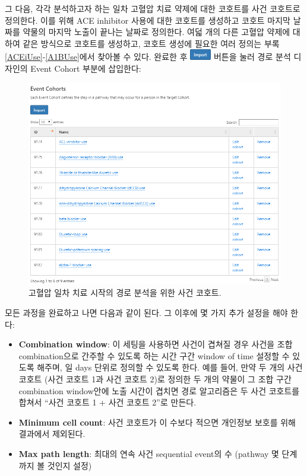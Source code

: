 \documentclass[10.5pt]{book}
\providecommand{\tightlist}{%
  \setlength{\itemsep}{0pt}\setlength{\parskip}{0pt}}
\theoremstyle{definition}
\theoremstyle{definition}
\theoremstyle{definition}
\theoremstyle{remark}
\begin{document}
그 다음, 각각 분석하고자 하는 일차 고혈압 치료 약제에 대한 코호트를 사건
코호트로 정의한다. 이를 위해 ACE inhibitor 사용에 대한 코호트를 생성하고
코호트 마지막 날짜를 약물의 마지막 노출이 끝나는 날짜로 정의한다. 여덟
개의 다른 고혈압 약제에 대하여 같은 방식으로 코호트를 생성하고, 코호트
생성에 필요한 여러 정의는 부록 \ref{ACEiUse}-\ref{A1BUse}에서 찾아볼 수
있다. 완료한 후
\includegraphics{images/Characterization/atlasImportButton.png} 버튼을
눌러 경로 분석 디자인의 Event Cohort 부분에 삽입한다:

\begin{figure}

{\centering \includegraphics[width=1\linewidth]{images/Characterization/atlasPathwaysEventCohorts} 

}

\caption{고혈압 일차 치료 시작의 경로 분석을 위한 사건 코호트.}\label{fig:atlasPathwaysEventCohorts}
\end{figure}

모든 과정을 완료하고 나면 다음과 같이 된다. 그 이후에 몇 가지 추가
설정을 해야 한다:

\begin{itemize}
\tightlist
\item
  \textbf{Combination window}: 이 세팅을 사용하면 사건이 겹쳐질 경우
  사건을 조합 combination으로 간주할 수 있도록 하는 시간 구간 window of
  time 설정할 수 있도록 해주며, 일 days 단위로 정의할 수 있도록 한다.
  예를 들어, 만약 두 개의 사건 코호트 (사건 코호트 1과 사건 코호트 2)로
  정의한 두 개의 약물이 그 조합 구간 combination window안에 노출 시간이
  겹치면 경로 알고리즘은 두 사건 코호트를 합쳐서 ``사건 코호트 1 + 사건
  코호트 2''로 만든다.
\item
  \textbf{Minimum cell count}: 사건 코호트가 이 수보다 적으면 개인정보
  보호를 위해 결과에서 제외된다.
\item
  \textbf{Max path length}: 최대의 연속 사건 sequential event의 수
  (pathway 몇 단계까지 볼 것인지 설정)
\end{itemize}
\end{document}

